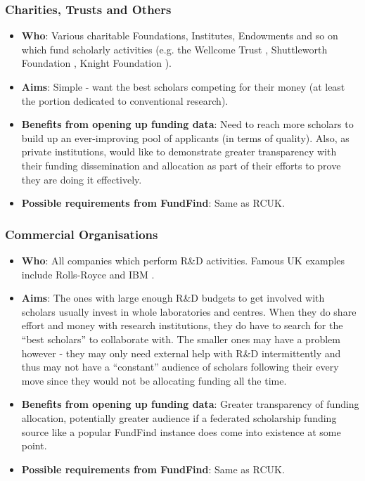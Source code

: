 \subsubsection{Charities, Trusts and Others}

\begin{itemize}
 \item \textbf{Who}: Various charitable Foundations, Institutes, Endowments and so on which fund scholarly activities (e.g. the Wellcome Trust \cite{wellcome-trust}, Shuttleworth Foundation \cite{shuttleworth-foundation}, Knight Foundation \cite{knight-foundation}).
 \item \textbf{Aims}: Simple - want the best scholars competing for their money (at least the portion dedicated to conventional research).
 \item \textbf{Benefits from opening up funding data}: Need to reach more scholars to build up an ever-improving pool of applicants (in terms of quality). Also, as private institutions, would like to demonstrate greater transparency with their funding dissemination and allocation as part of their efforts to prove they are doing it effectively.
 \item \textbf{Possible requirements from FundFind}: Same as RCUK.
\end{itemize}

\subsubsection{Commercial Organisations}

\begin{itemize}
 \item \textbf{Who}: All companies which perform R\&D activities. Famous UK examples include Rolls-Royce \cite{rolls-royce} and IBM \cite{ibm}.
 \item \textbf{Aims}: The ones with large enough R\&D budgets to get involved with scholars usually invest in whole laboratories and centres. When they do share effort and money with research institutions, they do have to search for the ``best scholars'' to collaborate with. The smaller ones may have a problem however - they may only need external help with R\&D intermittently and thus may not have a ``constant'' audience of scholars following their every move since they would not be allocating funding all the time.
 \item \textbf{Benefits from opening up funding data}: Greater transparency of funding allocation, potentially greater audience if a federated scholarship funding source like a popular FundFind instance does come into existence at some point.
 \item \textbf{Possible requirements from FundFind}: Same as RCUK.
\end{itemize}

